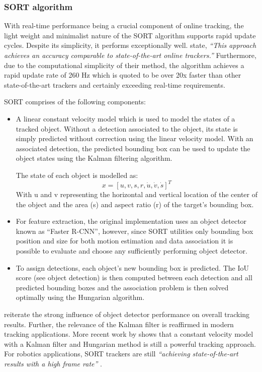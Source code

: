 \documentclass[a4paper,twoside,12pt]{report}
\begin{document}
\subsubsection{SORT algorithm}

With real-time performance being a crucial component of online tracking, the light weight and minimalist nature of the SORT algorithm supports rapid update cycles. Despite its simplicity, it performs exceptionally well. \cite{sort} state, \textit{``This approach achieves an accuracy comparable to state-of-the-art online trackers.''} Furthermore, due to the computational simplicity of their method, the algorithm achieves a rapid update rate of 260 Hz which is quoted to be over 20x faster than other state-of-the-art trackers and certainly exceeding real-time requirements.

SORT comprises of the following components:
\begin{itemize}
	\item A linear constant velocity model which is used to model the states of a tracked object. Without a detection associated to the object, its state is simply predicted without correction using the linear velocity model. With an associated detection, the predicted bounding box can be used to update the object states using the Kalman filtering algorithm.

	The state of each object is modelled as:
\begin{equation}
x = [u,v,s,r,\dot{u},\dot{v},\dot{s}]^T
\end{equation}
With u and v representing the horizontal and vertical location of the center of the object and the area (s) and aspect ratio (r) of the target’s bounding box.

	\item For feature extraction, the original implementation uses an object detector known as ``Faster R-CNN'', however, since SORT utilities only bounding box position and size for both motion estimation and data association \citep{sort} it is possible to evaluate and choose any sufficiently performing object detector.
	\item To assign detections, each object's new bounding box is predicted. The IoU score (see object detection) is then computed between each detection and all predicted bounding boxes and the association problem is then solved optimally using the Hungarian algorithm.
\end{itemize}

\cite{sort} reiterate the strong influence of object detector performance on overall tracking results. Further, the relevance of the Kalman filter is reaffirmed in modern tracking applications. More recent work by \cite{sort++} shows that a constant velocity model with a Kalman filter and Hungarian method is still a powerful tracking approach. For robotics applications, SORT trackers are still \textit{``achieving state-of-the-art results with a high frame rate''} \citep{sortrob}.
\end{document}
